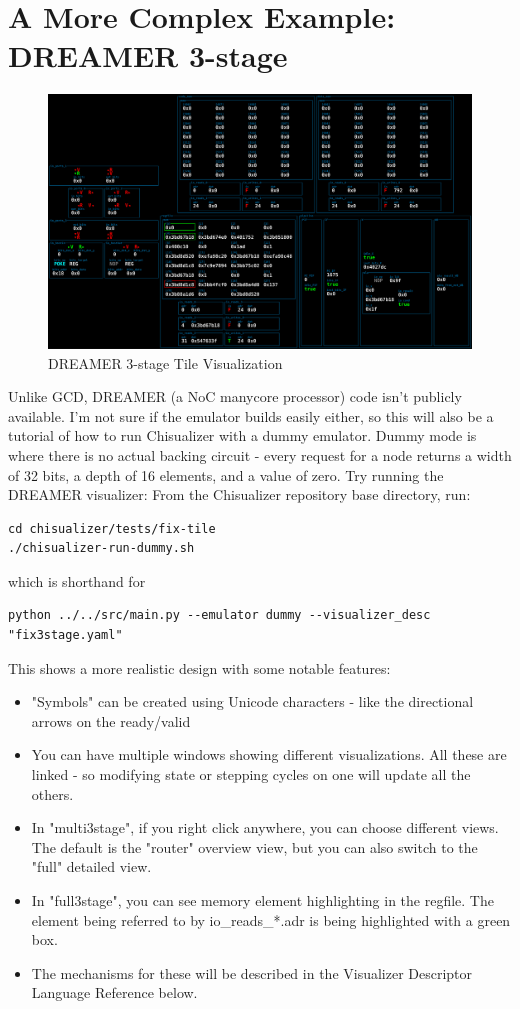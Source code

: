 \documentclass[11pt]{article}
\begin{document}
\section{A More Complex Example: DREAMER 3-stage}
\begin{figure}[h!]
  \centering
    \includegraphics[scale=.25]{images/full3stage_0_141126_121155}
  \caption{DREAMER 3-stage Tile Visualization}
\end{figure}

Unlike GCD, DREAMER (a NoC manycore processor) code isn't publicly available. I'm not sure if the emulator builds easily either, so this will also be a tutorial of how to run Chisualizer with a dummy emulator. Dummy mode is where there is no actual backing circuit - every request for a node returns a width of 32 bits, a depth of 16 elements, and a value of zero. Try running the DREAMER visualizer:
From the Chisualizer repository base directory, run:
\begin{verbatim}
cd chisualizer/tests/fix-tile
./chisualizer-run-dummy.sh
\end{verbatim}

which is shorthand for

\begin{verbatim}
python ../../src/main.py --emulator dummy --visualizer_desc "fix3stage.yaml"
\end{verbatim}

This shows a more realistic design with some notable features:
\begin{itemize}
  \item "Symbols" can be created using Unicode characters - like the directional arrows on the ready/valid
  \item You can have multiple windows showing different visualizations. All these are linked - so modifying state or stepping cycles on one will update all the others.
  \item In "multi3stage", if you right click anywhere, you can choose different views. The default is the "router" overview view, but you can also switch to the "full" detailed view.
  \item In "full3stage", you can see memory element highlighting in the regfile. The element being referred to by io\_reads\_*.adr is being highlighted with a green box.
  \item The mechanisms for these will be described in the Visualizer Descriptor Language Reference below.
\end{itemize}
\end{document}
